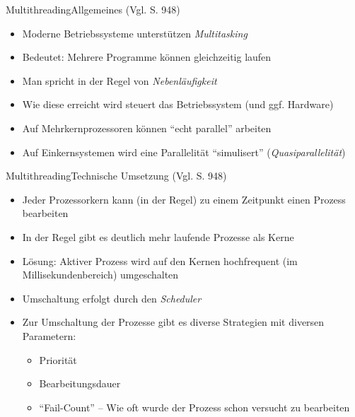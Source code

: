 \begin{frame}{Multithreading}{Allgemeines (Vgl. \cite{ullenboom2018java} S. 948)}
    \begin{itemize}
        \item Moderne Betriebssysteme unterstützen \textit{Multitasking}
        \item Bedeutet: Mehrere Programme können gleichzeitig laufen
        \item Man spricht in der Regel von \textit{Nebenläufigkeit}
        \item Wie diese erreicht wird steuert das Betriebssystem (und ggf. Hardware)
        \item Auf Mehrkernprozessoren können "`echt parallel"' arbeiten
        \item Auf Einkernsystemen wird eine Parallelität "`simulisert"' (\textit{Quasiparallelität})
    \end{itemize}
\end{frame}

\begin{frame}{Multithreading}{Technische Umsetzung (Vgl. \cite{ullenboom2018java} S. 948)}
    \begin{itemize}
        \item Jeder Prozessorkern kann (in der Regel) zu einem Zeitpunkt einen Prozess bearbeiten
        \item In der Regel gibt es deutlich mehr laufende Prozesse als Kerne
        \item Lösung: Aktiver Prozess wird auf den Kernen hochfrequent (im Millisekundenbereich) umgeschalten
        \item Umschaltung erfolgt durch den \textit{Scheduler}
        \item Zur Umschaltung der Prozesse gibt es diverse Strategien mit diversen Parametern:
        \begin{itemize}
            \item Priorität
            \item Bearbeitungsdauer
            \item "`Fail-Count"' -- Wie oft wurde der Prozess schon versucht zu bearbeiten
        \end{itemize}
    \end{itemize}
\end{frame}

